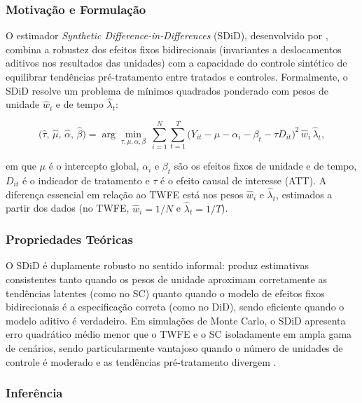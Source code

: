 \documentclass[a4paper,12pt]{article}
\begin{document}
\subsubsection{Motivação e Formulação}

O estimador \textit{Synthetic Difference-in-Differences} (SDiD), desenvolvido por
, combina a robustez dos efeitos fixos bidirecionais
(invariantes a deslocamentos aditivos nos resultados das unidades) com a capacidade do
controle sintético de equilibrar tendências pré-tratamento entre tratados e controles.
Formalmente, o SDiD resolve um problema de mínimos quadrados ponderado com pesos de
unidade $\hat{w}_i$ e de tempo $\hat{\lambda}_t$:

\begin{equation}
\big(\hat{\tau},\, \hat{\mu},\, \hat{\alpha},\, \hat{\beta}\big) =
\arg\min_{\tau,\mu,\alpha,\beta}\ \sum_{i=1}^{N}\sum_{t=1}^{T}
\big(Y_{it} - \mu - \alpha_i - \beta_t - \tau D_{it}\big)^2\, \hat{w}_i\, \hat{\lambda}_t,
\end{equation}

em que $\mu$ é o intercepto global, $\alpha_i$ e $\beta_t$ são os efeitos fixos de unidade
e de tempo, $D_{it}$ é o indicador de tratamento e $\tau$ é o efeito causal de interesse
(ATT). A diferença essencial em relação ao TWFE está nos pesos $\hat{w}_i$ e
$\hat{\lambda}_t$, estimados a partir dos dados (no TWFE, $\hat{w}_i = 1/N$ e
$\hat{\lambda}_t = 1/T$).

\subsubsection{Propriedades Teóricas}

O SDiD é duplamente
robusto no sentido informal: produz estimativas consistentes tanto quando os pesos de
unidade aproximam corretamente as tendências latentes (como no SC) quanto quando o
modelo de efeitos fixos bidirecionais é a especificação correta (como no DiD), sendo
eficiente quando o modelo aditivo é verdadeiro. Em simulações de Monte Carlo, o SDiD
apresenta erro quadrático médio menor que o TWFE e o SC isoladamente em ampla gama de
cenários, sendo particularmente vantajoso quando o número de unidades de controle é
moderado e as tendências pré-tratamento divergem \cite{arkhangelsky2021}.

\subsubsection{Inferência}
\end{document}
